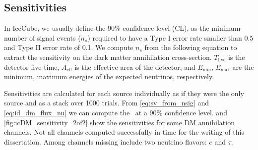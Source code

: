 \subsection{Sensitivities} \label{sec:icDM_sensitivity}

In IceCube, we usually define the 90\% confidence level (CL), as the minimum number of signal events ($n_s$) required to have a Type I error rate smaller than 0.5 and Type II error rate of 0.1.
We compute  $n_s$ from the following equation
\svFromNSig
to extract the sensitivity on the dark matter annihilation cross-section.
$T_\mathrm{live} $ is the detector live time, $ A_\mathrm{eff} $ is the effective area of the detector, and $ E_\mathrm{min} $, $ E_\mathrm{max} $ are the minimum, maximum energies of the expected neutrinos, respectively.

Sensitivities are calculated for each source individually as if they were the only source and as a stack over 1000 trials.
From \cref{eq:sv_from_nsig} and \cref{eq:id_dm_flux_nu} we can compute the \sv~at a 90\% confidence level.
 and \cref{fig:icDM_sensitivity_2of2} show the sensitivities for some DM annihilation channels.
Not all channels computed successfully in time for the writing of this dissertation.
Among channels missing include two neutrino flavors: $e$ and $\tau$.

